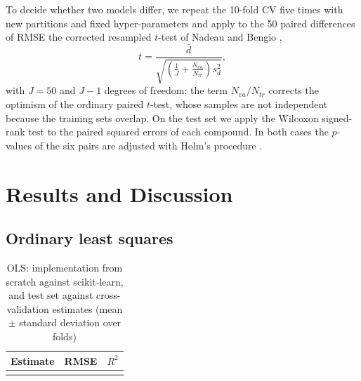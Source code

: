 \documentclass[conference]{IEEEtran}
\begin{document}
To decide whether two models differ, we repeat the 10-fold CV five
times with new partitions and fixed hyper-parameters and apply to the
50 paired differences of RMSE the corrected resampled $t$-test of
Nadeau and Bengio \cite{nadeau2003},
\begin{equation}
t = \frac{\bar d}{\sqrt{\left(\frac{1}{J}+\frac{N_{va}}{N_{tr}}\right)s_d^2}},
\label{eq:nb}
\end{equation}
with $J=50$ and $J-1$ degrees of freedom; the term
$N_{va}/N_{tr}$ corrects the optimism of the ordinary paired $t$-test,
whose samples are not independent because the training sets overlap.
On the test set we apply the Wilcoxon signed-rank test
\cite{wilcoxon1945} to the paired squared errors of each compound. In
both cases the $p$-values of the six pairs are adjusted with Holm's
procedure \cite{holm1979}.

\section{Results and Discussion}
\label{sec:results}

\subsection{Ordinary least squares}
\label{subsec:res_ols}

\begin{table}[htbp]
\caption{OLS: implementation from scratch against scikit-learn, and
test set against cross-validation estimates (mean $\pm$ standard
deviation over folds)}
\label{tab:ols}
\centering
\begin{tabular}{lll}
\toprule
Estimate & RMSE & $R^2$ \\
\midrule
\\
\bottomrule
\end{tabular}
\end{table}
\end{document}
